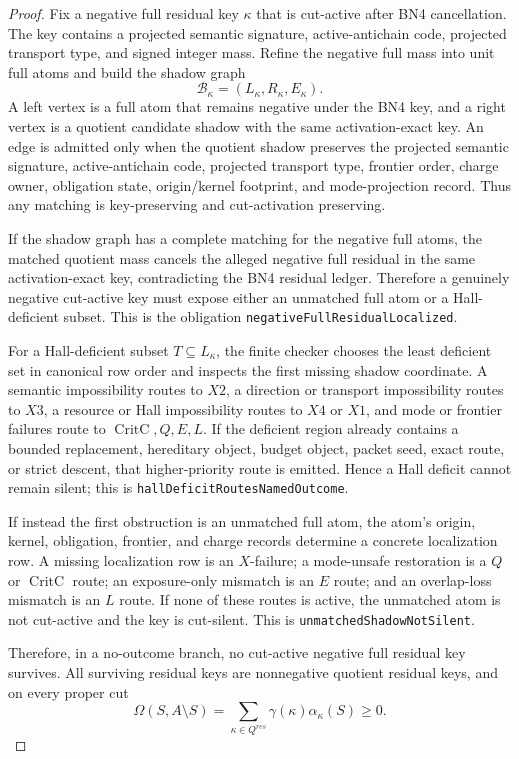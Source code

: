 \documentclass[10.5pt,a4paper]{article}
\newcommand{\CritC}{\operatorname{CritC}}
\begin{document}
\begin{proof}
Fix a negative full residual key \(\kappa\) that is cut-active after BN4 cancellation.  The key contains a projected semantic signature, active-antichain code, projected transport type, and signed integer mass.  Refine the negative full mass into unit full atoms and build the shadow graph
\[
\mathcal B_\kappa=(L_\kappa,R_\kappa,E_\kappa).
\]
A left vertex is a full atom that remains negative under the BN4 key, and a right vertex is a quotient candidate shadow with the same activation-exact key.  An edge is admitted only when the quotient shadow preserves the projected semantic signature, active-antichain code, projected transport type, frontier order, charge owner, obligation state, origin/kernel footprint, and mode-projection record.  Thus any matching is key-preserving and cut-activation preserving.

If the shadow graph has a complete matching for the negative full atoms, the matched quotient mass cancels the alleged negative full residual in the same activation-exact key, contradicting the BN4 residual ledger.  Therefore a genuinely negative cut-active key must expose either an unmatched full atom or a Hall-deficient subset.  This is the obligation \texttt{negativeFullResidualLocalized}.

For a Hall-deficient subset \(T\subseteq L_\kappa\), the finite checker chooses the least deficient set in canonical row order and inspects the first missing shadow coordinate.  A semantic impossibility routes to \(X2\), a direction or transport impossibility routes to \(X3\), a resource or Hall impossibility routes to \(X4\) or \(X1\), and mode or frontier failures route to \(\CritC,Q,E,L\).  If the deficient region already contains a bounded replacement, hereditary object, budget object, packet seed, exact route, or strict descent, that higher-priority route is emitted.  Hence a Hall deficit cannot remain silent; this is \texttt{hallDeficitRoutesNamedOutcome}.

If instead the first obstruction is an unmatched full atom, the atom's origin, kernel, obligation, frontier, and charge records determine a concrete localization row.  A missing localization row is an \(X\)-failure; a mode-unsafe restoration is a \(Q\) or \(\CritC\) route; an exposure-only mismatch is an \(E\) route; and an overlap-loss mismatch is an \(L\) route.  If none of these routes is active, the unmatched atom is not cut-active and the key is cut-silent.  This is \texttt{unmatchedShadowNotSilent}.

Therefore, in a no-outcome branch, no cut-active negative full residual key survives.  All surviving residual keys are nonnegative quotient residual keys, and on every proper cut
\[
\Omega(S,A\setminus S)=\sum_{\kappa\in Q^{res}}\gamma(\kappa)\alpha_\kappa(S)\ge0.
\]
\end{proof}
\end{document}

